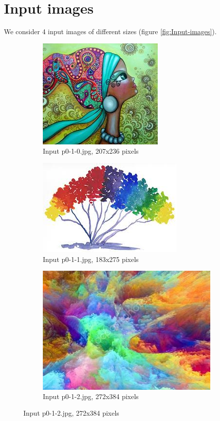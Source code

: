 \section{Input images}
We consider 4 input images of different sizes (figure \ref{fig:Input-images}).
\begin{figure}[h!]
\centering
\begin{subfigure}{0.5\textwidth}
  \centering
  \includegraphics[width=0.5\linewidth]{../input/p0-1-0.jpg}
  \caption{Input p0-1-0.jpg, 207x236 pixels}
  \label{fig:sfig1}
\end{subfigure}%
\begin{subfigure}{0.5\textwidth}
  \centering
  \includegraphics[width=0.5\linewidth]{../input/p0-1-1.jpg}
  \caption{Input p0-1-1.jpg, 183x275 pixels}
  \label{fig:sfig2}
\end{subfigure}
\begin{subfigure}{0.5\textwidth}
  \centering
  \includegraphics[width=0.5\linewidth]{../input/p0-1-2.jpg}
  \caption{Input p0-1-2.jpg, 272x384 pixels}
  \label{fig:sfig1}

\end{subfigure}
\end{figure}
